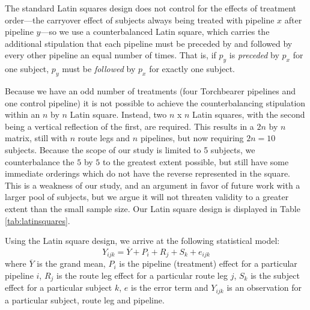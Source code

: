 The standard Latin squares design does not control for the effects of treatment order---the carryover effect of subjects always being treated with pipeline $x$ after pipeline $y$---so we use a counterbalanced Latin square, which carries the additional stipulation that each pipeline must be preceded by and followed by every other pipeline an equal number of times. That is, if $p_y$ is \textit{preceded} by $p_x$ for one subject, $p_y$ must be \textit{followed} by $p_x$ for exactly one subject.

Because we have an odd number of treatments (four Torchbearer pipelines and one control pipeline) it is not possible to achieve the counterbalancing stipulation within an $n$ by $n$ Latin square. Instead, two $n$ x $n$ Latin squares, with the second being a vertical reflection of the first, are required. This results in a $2n$ by $n$ matrix, still with $n$ route legs and $n$ pipelines, but now requiring $2n = 10$ subjects. Because the scope of our study is limited to 5 subjects, we counterbalance the $5$ by $5$ to the greatest extent possible, but still have some immediate orderings which do not have the reverse represented in the square. This is a weakness of our study, and an argument in favor of future work with a larger pool of subjects, but we argue it will not threaten validity to a greater extent than the small sample size. Our Latin square design is displayed in Table \ref{tab:latinsquares}.

Using the Latin square design, we arrive at the following statistical model:
\begin{equation}\label{eq:model}
    Y_{ijk} = \overline{Y} + P_i + R_j + S_k + e_{ijk}
\end{equation}
where $\overline{Y}$ is the grand mean, $P_i$ is the pipeline (treatment) effect for a particular pipeline $i$, $R_j$ is the route leg effect for a particular route leg $j$, $S_k$ is the subject effect for a particular subject $k$, $e$ is the error term and $Y_{ijk}$ is an observation for a particular subject, route leg and pipeline.


